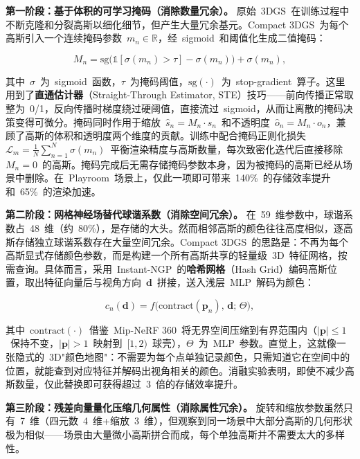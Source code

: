 \textbf{第一阶段：基于体积的可学习掩码（消除数量冗余）。}
原始~3DGS~在训练过程中不断克隆和分裂高斯以细化细节，但产生大量冗余基元。Compact 3DGS~为每个高斯引入一个连续掩码参数~$m_n \in \mathbb{R}$，经~sigmoid~和阈值化生成二值掩码：

\begin{equation}
    M_n = \mathrm{sg}\bigl(\mathbb{1}[\sigma(m_n) > \tau] - \sigma(m_n)\bigr) + \sigma(m_n),
\end{equation}

其中~$\sigma$~为~sigmoid~函数，$\tau$~为掩码阈值，$\mathrm{sg}(\cdot)$~为~stop-gradient~算子。这里用到了\textbf{直通估计器}（Straight-Through Estimator, STE）技巧——前向传播正常取整为~0/1，反向传播时梯度绕过硬阈值，直接流过~sigmoid，从而让离散的掩码决策变得可微分。掩码同时作用于缩放~$\hat{s}_n = M_n \cdot s_n$~和不透明度~$\hat{o}_n = M_n \cdot o_n$，兼顾了高斯的体积和透明度两个维度的贡献。训练中配合掩码正则化损失~$\mathcal{L}_m = \frac{1}{N}\sum_{n=1}^{N} \sigma(m_n)$~平衡渲染精度与高斯数量，每次致密化迭代后直接移除~$M_n = 0$~的高斯。掩码完成后无需存储掩码参数本身，因为被掩码的高斯已经从场景中删除。在~Playroom~场景上，仅此一项即可带来~140\%~的存储效率提升和~65\%~的渲染加速。

\textbf{第二阶段：网格神经场替代球谐系数（消除空间冗余）。}
在~59~维参数中，球谐系数占~48~维（约~80\%），是存储的大头。然而相邻高斯的颜色往往高度相似，逐高斯存储独立球谐系数存在大量空间冗余。Compact 3DGS~的思路是：不再为每个高斯显式存储颜色参数，而是构建一个所有高斯共享的轻量级~3D~特征网格，按需查询。具体而言，采用~Instant-NGP~的\textbf{哈希网格}（Hash Grid）编码高斯位置，取出特征向量后与视角方向~$\mathbf{d}$~拼接，送入浅层~MLP~解码为颜色：

\begin{equation}
    c_n(\mathbf{d}) = f\bigl(\mathrm{contract}(\mathbf{p}_n),\, \mathbf{d};\, \Theta\bigr),
\end{equation}

其中~$\mathrm{contract}(\cdot)$~借鉴~Mip-NeRF 360~将无界空间压缩到有界范围内（$|\mathbf{p}| \leq 1$~保持不变，$|\mathbf{p}| > 1$~映射到~$[1, 2)$~球壳），$\Theta$~为~MLP~参数。直觉上，这就像一张隐式的~3D"颜色地图"：不需要为每个点单独记录颜色，只需知道它在空间中的位置，就能查到对应特征并解码出视角相关的颜色。消融实验表明，即使不减少高斯数量，仅此替换即可获得超过~3~倍的存储效率提升。

\textbf{第三阶段：残差向量量化压缩几何属性（消除属性冗余）。}
旋转和缩放参数虽然只有~7~维（四元数~4~维+缩放~3~维），但观察到同一场景中大部分高斯的几何形状极为相似——场景由大量微小高斯拼合而成，每个单独高斯并不需要太大的多样性。

